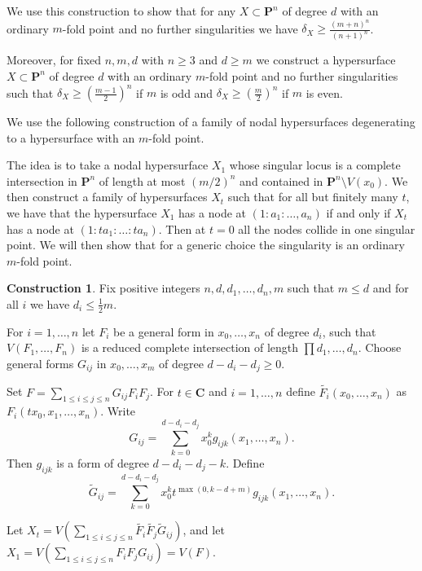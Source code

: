 \documentclass{amsart}
\newcommand{\Ps}{\mathbf{P}}
\newcommand{\C}{\mathbf{C}}
\theoremstyle{definition}
\newtheorem{construction}[lemma]{Construction}
\theoremstyle{remark}
\begin{document}
We use this construction to show that  for any $X\subset \Ps^n$ of degree $d$ with an ordinary $m$-fold point and no further singularities we have  $\delta_X\geq \frac{(m+n)^n}{(n+1)^n}$.

Moreover, for fixed $n,m,d$ with $n\geq 3$ and $d\geq m$ we construct a hypersurface $X\subset \Ps^n$ of degree $d$ with an ordinary $m$-fold point and no further singularities such that $\delta_X\geq \left( \frac{m-1}{2} \right)^n$ if $m$ is odd and $\delta_X \geq \left( \frac{m}{2}\right)^n$ if $m$ is even.

We  use the following construction of a family of nodal hypersurfaces degenerating to a hypersurface with an $m$-fold point.

The idea is to take a nodal hypersurface $X_1$ whose singular locus is a complete intersection in $\Ps^n$ of length at most $(m/2)^n$  and contained in $\Ps^n\setminus V(x_0)$.  We then construct a family of hypersurfaces $X_t$ such that for all but finitely many $t$, we have  that the hypersurface $X_1$ has a node at $(1:a_1:\dots,a_n)$ if and only if $X_t$ has a node at $(1:ta_1:\dots:ta_n)$. Then at $t=0$ all the nodes collide in one singular point. We will then show that for a generic choice the singularity is an ordinary $m$-fold point. 

\begin{construction}\label{ConstMain}
Fix positive integers $n, d,d_1,\dots,d_n,m$ such that $m\leq d$ and for all $i$ we have $d_i\leq \frac{1}{2}m$. 

For $i=1,\dots,n$ let $F_i$ be a general form in $x_0,\dots,x_n$ of degree $d_i$, such that $V(F_1,\dots,F_n)$ is a  reduced complete intersection of length $\prod d_1,\dots,d_n$.
Choose general forms $G_{ij}$ in $x_0,\dots,x_m$ of degree $d-d_i-d_j\geq 0$. 

Set $F=\sum_{1\leq i \leq j \leq n} G_{ij}F_iF_j$.
For $t\in \C$ and $i=1,\dots,n$ define $\tilde{F_i}(x_0,\dots,x_n)$ as $F_i(tx_0,x_1,\dots, x_n)$. Write 
\[ G_{ij}=\sum_{k=0}^{d-d_i-d_j} x_0^{k}  g_{ijk}(x_1,\dots,x_n).\]
Then $g_{ijk}$ is a form of degree $d-d_i-d_j-k$.
Define \[\tilde{G}_{ij}=\sum_{k=0}^{d-d_i-d_j} x_0^k  t^{\max(0,k-d+m)} g_{ijk}(x_1,\dots,x_n).\]

Let $X_t=V(\sum_{1\leq i\leq j \leq n} \tilde{F_i}\tilde{F_j}\tilde{G}_{ij})$, and let $X_1=V(\sum_{1\leq i\leq j \leq n} F_iF_jG_{ij})=V(F)$.
\end{construction}
\end{document}
